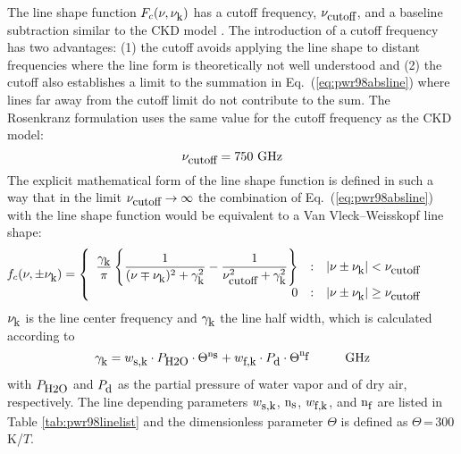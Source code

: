 The line shape function $F_{c}(\nu,\nu_{\mbox{\rm \small k}})$ has a cutoff frequency, $\nu_{\mbox{\rm \small cutoff}}$,
and a baseline subtraction similar to the CKD model \citep{clough:89}.
The introduction of a cutoff frequency has two advantages: (1) the
cutoff avoids applying the line shape to distant frequencies where the 
line form is theoretically not well understood and (2) the cutoff also
establishes a limit to the summation in Eq.~(\ref{eq:pwr98absline}) where lines
far away from the cutoff limit do not contribute to the sum.  
The Rosenkranz formulation uses the same value for
the cutoff frequency as the CKD model:
\begin{equation} 
 \label{cutoff}
 \nu_{\mbox{\rm \small cutoff}} = 750\mbox{ GHz}
\end{equation}
%
The explicit mathematical form of the line shape function is defined 
in such a way that in the limit $\nu_{\mbox{\rm \small cutoff}} \rightarrow \infty$ the 
combination of Eq.~(\ref{eq:pwr98absline}) with the line shape function would 
be equivalent to a Van Vleck--Weisskopf \citep{vanvleck:45} line shape: 
\begin{equation}
 \label{eq:pwr98lineshape}
 \hspace*{-8mm}\shapefpm = 
   \left \{ \begin{array}{r@{\quad:\quad}l} 
   \displaystyle{\frac{\gamk}{\pi}} 
   \left \{ \displaystyle{\frac{1}{(\nu \mp \nuk)^2 + \gamk^2}} - 
   \displaystyle{\frac{1}{\nucut^2 + \gamk^2}} \right \}
   & |\nu \pm \nuk| < \nucut \\ 
   0 & |\nu \pm \nuk| \geq \nucut
                       \end{array} \right.
\end{equation}
$\nu_{\mbox{\rm \small k}}$ is the line center frequency and $\gamma_{\mbox{\rm \small k}}$ the line
half width, which is calculated according to 
\begin{equation}
 \label{eq:pwr98gamma}
 \gamk = \ws \cdot \phzo \cdot \Theta^{\xs} + 
         \wf \cdot \pda  \cdot \Theta^{\xf}\hspace*{10mm}\mbox{GHz}
\end{equation}
with $P_{\mbox{\rm \small H2O}}$ and $P_{\mbox{\rm \small d}}$ as the partial pressure of water vapor and of 
dry air, respectively. The line depending parameters $w_{\mbox{\rm \small s,k}}$, ${\rm n}_{\mbox{\rm \small s}}$, 
$w_{\mbox{\rm \small f,k}}$, and ${\rm n}_{\mbox{\rm \small f}}$ are listed in Table \ref{tab:pwr98linelist} and the 
dimensionless parameter $\Theta$ is defined as $\Theta$\,=\,300\,K/$T$.

